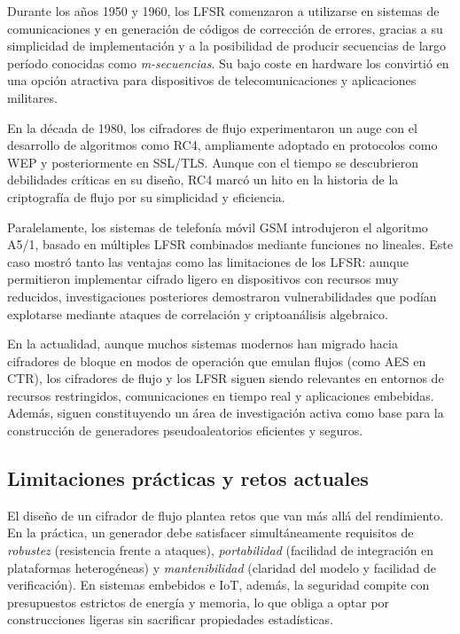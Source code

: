 Durante los años 1950 y 1960, los LFSR comenzaron a utilizarse en sistemas de
comunicaciones y en generación de códigos de corrección de errores, gracias a su
simplicidad de implementación y a la posibilidad de producir secuencias de largo
período conocidas como \textit{m-secuencias}. Su bajo coste en hardware los
convirtió en una opción atractiva para dispositivos de telecomunicaciones y
aplicaciones militares.

En la década de 1980, los cifradores de flujo experimentaron un auge con el
desarrollo de algoritmos como RC4, ampliamente adoptado en protocolos como WEP y
posteriormente en SSL/TLS. Aunque con el tiempo se descubrieron debilidades
críticas en su diseño, RC4 marcó un hito en la historia de la criptografía de
flujo por su simplicidad y eficiencia.

Paralelamente, los sistemas de telefonía móvil GSM introdujeron el algoritmo
A5/1, basado en múltiples LFSR combinados mediante funciones no lineales. Este
caso mostró tanto las ventajas como las limitaciones de los LFSR: aunque
permitieron implementar cifrado ligero en dispositivos con recursos muy
reducidos, investigaciones posteriores demostraron vulnerabilidades que podían
explotarse mediante ataques de correlación y criptoanálisis algebraico.

En la actualidad, aunque muchos sistemas modernos han migrado hacia cifradores
de bloque en modos de operación que emulan flujos (como AES en CTR), los
cifradores de flujo y los LFSR siguen siendo relevantes en entornos de recursos
restringidos, comunicaciones en tiempo real y aplicaciones embebidas. Además,
siguen constituyendo un área de investigación activa como base para la
construcción de generadores pseudoaleatorios eficientes y seguros.


\subsection*{Limitaciones prácticas y retos actuales}

El diseño de un cifrador de flujo plantea retos que van más allá del rendimiento.
En la práctica, un generador debe satisfacer simultáneamente requisitos de
\emph{robustez} (resistencia frente a ataques), \emph{portabilidad} (facilidad de
integración en plataformas heterogéneas) y \emph{mantenibilidad} (claridad del
modelo y facilidad de verificación). En sistemas embebidos e IoT, además, la
seguridad compite con presupuestos estrictos de energía y memoria, lo que obliga
a optar por construcciones ligeras sin sacrificar propiedades estadísticas.

